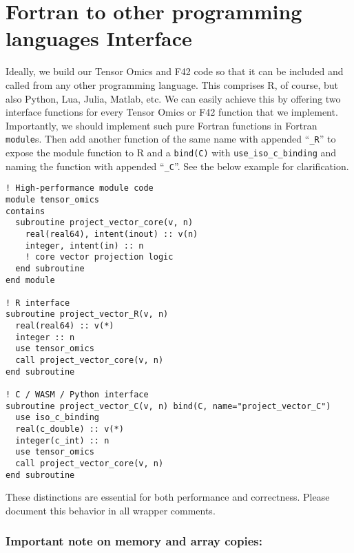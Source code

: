 \documentclass{article}
\begin{document}
\section{Fortran to other programming languages Interface}

Ideally, we build our Tensor Omics and F42 code so that it can be included and
called from any other programming language. This comprises R, of course, but
also Python, Lua, Julia, Matlab, etc. We can easily achieve this by offering
two interface functions for every Tensor Omics or F42 function that we
implement. Importantly, we should implement such pure Fortran functions in
Fortran \texttt{module}s. Then add another function of the same name with
appended ``\texttt{\_R}'' to expose the module function to R and a
\texttt{bind(C)} with \texttt{use\_iso\_c\_binding} and naming the function
with appended ``\texttt{\_C}''. See the below example for clarification.

\begin{verbatim}
! High-performance module code
module tensor_omics
contains
  subroutine project_vector_core(v, n)
    real(real64), intent(inout) :: v(n)
    integer, intent(in) :: n
    ! core vector projection logic
  end subroutine
end module

! R interface
subroutine project_vector_R(v, n)
  real(real64) :: v(*)
  integer :: n
  use tensor_omics
  call project_vector_core(v, n)
end subroutine

! C / WASM / Python interface
subroutine project_vector_C(v, n) bind(C, name="project_vector_C")
  use iso_c_binding
  real(c_double) :: v(*)
  integer(c_int) :: n
  use tensor_omics
  call project_vector_core(v, n)
end subroutine
\end{verbatim}

These distinctions are essential for both performance and correctness. Please document this behavior in all wrapper comments.

\subsubsection{Important note on memory and array copies:}
\end{document}
